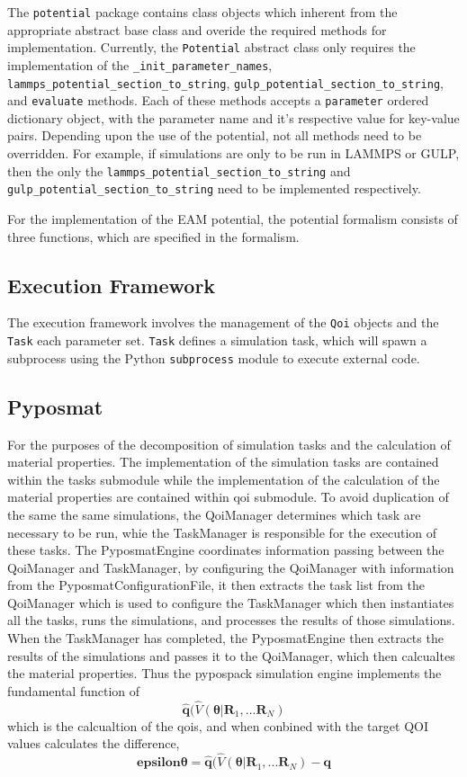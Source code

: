 The \verb|potential| package contains class objects which inherent from the appropriate abstract base class and overide the required methods for implementation.  Currently, the \verb|Potential| abstract class only requires the implementation of the \verb|_init_parameter_names|, \verb|lammps_potential_section_to_string|, \verb|gulp_potential_section_to_string|, and \verb|evaluate| methods.  Each of these methods accepts a \verb|parameter| ordered dictionary object, with the parameter name and it's respective value for key-value pairs.  Depending upon the use of the potential, not all methods need to be overridden. For example, if simulations are only to be run in LAMMPS or GULP, then the only the \verb|lammps_potential_section_to_string| and \verb|gulp_potential_section_to_string| need to be implemented respectively.

For the implementation of the EAM potential, the potential formalism consists of three functions, which are specified in the formalism.

\subsection{Execution Framework}

The execution framework involves the management of the \verb|Qoi| objects and the \verb|Task| each parameter set.  \verb|Task| defines a simulation task, which will spawn a subprocess using the Python \verb|subprocess| module to execute external code.

\subsection{Pyposmat}
For the purposes of the decomposition of simulation tasks and the calculation of material properties.  The implementation of the simulation tasks are contained within the tasks submodule while the implementation of the calculation of the material properties are contained within qoi submodule.  To avoid duplication of the same the same simulations, the QoiManager determines which task are necessary to be run, whie the TaskManager is responsible for the execution of these tasks.  The PyposmatEngine coordinates information passing between the QoiManager and TaskManager, by configuring the QoiManager with information from the PyposmatConfigurationFile, it then extracts the task list from the QoiManager which is used to configure the TaskManager which then instantiates all the tasks, runs the simulations, and processes the results of those simulations.  When the TaskManager has completed, the PyposmatEngine then extracts the results of the simulations and passes it to the QoiManager, which then calcualtes the material properties.  Thus the pypospack simulation engine implements the fundamental function of
\begin{equation}
    \bm{\hat{q}}(\hat{V}(\bm{\theta}|\bm{R}_1,...\bm{R}_N)
\end{equation}
which is the calcualtion of the qois, and when conbined with the target QOI values calculates the difference,
\begin{equation}
    \bm{epsilon{\theta}}=\bm{\hat{q}}(\hat{V}(\bm{\theta}|\bm{R}_1,...\bm{R}_N)-\bm{q}
\end{equation}

